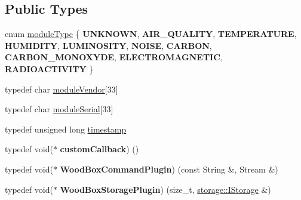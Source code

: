 \subsection*{Public Types}
\begin{DoxyCompactItemize}
\item 
enum \mbox{\hyperlink{classwood_box_1_1module_1_1_wood_box_module_af74476c8a785de7fe587c4fb68435673}{module\+Type}} \{ \newline
{\bfseries U\+N\+K\+N\+O\+WN}, 
{\bfseries A\+I\+R\+\_\+\+Q\+U\+A\+L\+I\+TY}, 
{\bfseries T\+E\+M\+P\+E\+R\+A\+T\+U\+RE}, 
{\bfseries H\+U\+M\+I\+D\+I\+TY}, 
\newline
{\bfseries L\+U\+M\+I\+N\+O\+S\+I\+TY}, 
{\bfseries N\+O\+I\+SE}, 
{\bfseries C\+A\+R\+B\+ON}, 
{\bfseries C\+A\+R\+B\+O\+N\+\_\+\+M\+O\+N\+O\+X\+Y\+DE}, 
\newline
{\bfseries E\+L\+E\+C\+T\+R\+O\+M\+A\+G\+N\+E\+T\+IC}, 
{\bfseries R\+A\+D\+I\+O\+A\+C\+T\+I\+V\+I\+TY}
 \}
\item 
typedef char \mbox{\hyperlink{classwood_box_1_1module_1_1_wood_box_module_adf5d59bae2980ff138284d0fa885df19}{module\+Vendor}}\mbox{[}33\mbox{]}
\item 
typedef char \mbox{\hyperlink{classwood_box_1_1module_1_1_wood_box_module_a3a6503bbd5147a06ba50081f97177b46}{module\+Serial}}\mbox{[}33\mbox{]}
\item 
typedef unsigned long \mbox{\hyperlink{classwood_box_1_1module_1_1_wood_box_module_ab03bf835ec02656605c3c0df0188dc28}{timestamp}}
\item 
\mbox{\label{classwood_box_1_1module_1_1_wood_box_module_ab6d400f05cc572fb9fd28dd0baf6d346}} 
typedef void($\ast$ {\bfseries custom\+Callback}) ()
\item 
\mbox{\label{classwood_box_1_1module_1_1_wood_box_module_ab0e08bb82f5585fd357ce1881855d0e2}} 
typedef void($\ast$ {\bfseries Wood\+Box\+Command\+Plugin}) (const String \&, Stream \&)
\item 
\mbox{\label{classwood_box_1_1module_1_1_wood_box_module_ac7fea0a06e9fcab2ffb63500f6cd6565}} 
typedef void($\ast$ {\bfseries Wood\+Box\+Storage\+Plugin}) (size\+\_\+t, \mbox{\hyperlink{classwood_box_1_1storage_1_1_i_storage}{storage\+::\+I\+Storage}} \&)
\end{DoxyCompactItemize}
